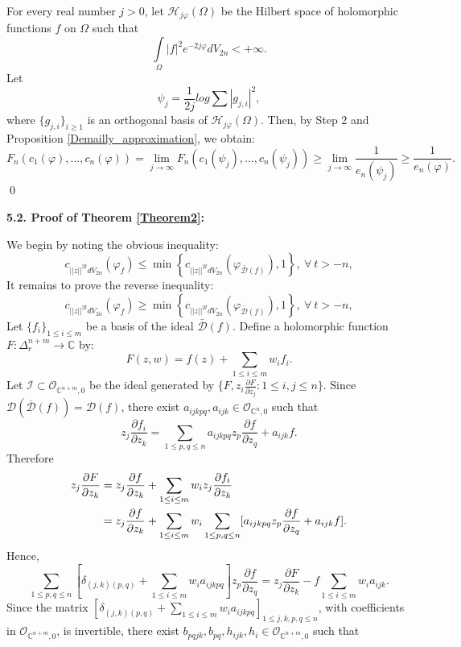 \documentclass[a4paper,oneside,reqno,11pt]{article}
\begin{document}
For every real number $j>0$, let $\mathcal{H}_{j\varphi}(\Omega)$ be the Hilbert space of holomorphic functions $f$ on $\Omega$ such that 
$$\int\limits_{\Omega} |f|^2e^{-2j\varphi} dV_{2n}<+\infty .$$ 
Let 
$$\psi_j=\frac{1}{2j}log\sum|g_{j,i}|^2,$$ 
where $\{ g_{j,i} \}_{ i\geq 1 }$ is an orthogonal basis of $\mathcal{H}_{j\varphi}(\Omega)$. Then, by Step 2 and Proposition \ref{Demailly_approximation}, we obtain:
$$F_n ( c_1 ( \varphi ), ... , c_{ n } ( \varphi  ) ) = \lim\limits_{ j\to \infty } F_n ( c_1 ( \psi_j ), ... , c_{ n } ( \psi_j ) ) \geq  \lim\limits_{ j\to \infty }  \frac { 1 } { e_n ( \psi_j ) } \geq \frac { 1 } { e_n (\varphi ) }.$$
\qed

{\bf 5.2. Proof of Theorem \ref{Theorem2}:}

We begin by noting the obvious inequality:
$$c_{ || z ||^{2t} dV_{2n} } ( \varphi_{ f } ) \leq \min \left\{ c_{ || z ||^{2t} dV_{2n} } ( \varphi_{ \bar { \mathcal  D } ( f ) } ), 1 \right\},\ \forall\ t > -n,$$
It remains to prove the reverse inequality:
$$c_{ || z ||^{2t} dV_{2n} } ( \varphi_{ f } ) \geq \min \left\{ c_{ || z ||^{2t} dV_{2n} } ( \varphi_{ \bar { \mathcal  D } ( f ) } ), 1 \right\},\ \forall\ t > -n,$$
Let $\{ f_i \}_{1\leq i\leq m}$ be a basis of the ideal $\bar{ \mathcal {D} } ( f )$. Define a holomorphic function $F:\Delta_{ r }^{ n + m }\to \mathbb C$ by:
$$F( z , w ) = f( z ) + \sum\limits_{ 1\leq i\leq m} w_i f_i .$$
Let $\mathcal I\subset\mathcal O_{ \mathbb C^{ n + m }, 0}$ be the ideal generated by $\{F, z_i \frac { \partial F } { \partial z_j } : 1\leq i ,j\leq n\}$. Since $\mathcal D ( \overline{ \mathcal D } ( f ) ) = \mathcal D (f)$, there exist $a_{ ijkpq }, a_{ ijk }\in\mathcal { O }_{ \mathbb C^{n}, 0 }$ such that 
$$z_j \frac { \partial f_i } { \partial z_k } = \sum\limits_{ 1\leq p, q\leq n } a_{ijkpq} z_p \frac { \partial f} { \partial z_q} + a_{ ijk } f.$$ 
Therefore
$$\aligned z_j \frac { \partial F } { \partial z_k } &= z_j \frac { \partial f } { \partial z_k } + \sum\limits_{ 1\leq i \leq m } w_i z_j \frac { \partial f_i } { \partial z_k }\\ 
&= z_j \frac { \partial f } { \partial z_k } + \sum\limits_{ 1\leq i \leq m } w_i \sum\limits_{ 1\leq p, q\leq n } [ a_{ ijkpq } z_p \frac { \partial f} { \partial z_q} + a_{ ijk } f ]. 
\endaligned$$ 
Hence,
$$\sum\limits_{ 1\leq p, q\leq n } [ \delta_{ (j,k) (p,q) } + \sum\limits_{ 1\leq i\leq m} w_i a_{ ijkpq } ] z_p \frac { \partial f} { \partial z_q}  = z_j \frac { \partial F } { \partial z_k } - f \sum\limits_{ 1\leq i \leq m } w_i a_{ ijk }.$$ 
Since the matrix $[ \delta_{ (j,k) (p,q) } + \sum\limits_{ 1\leq i\leq m} w_i a_{ ijkpq } ]_{1 \leq j,k,p,q\leq n}$, with coefficients in $\mathcal { O }_{ \mathbb C^{ n + m }, 0 }$, is invertible, there exist $b_{ pqjk },  b_{ pq }, h_{ ijk }, h_i\in\mathcal { O }_{ \mathbb C^{ n + m }, 0 }$ such that 
\end{document}
